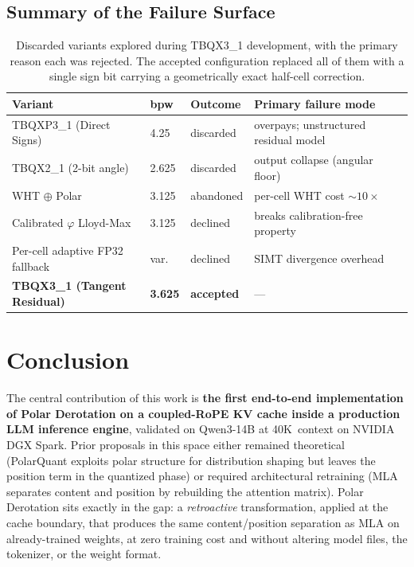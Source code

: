 \documentclass[10pt,twocolumn]{article}
\begin{document}
\subsection{Summary of the Failure Surface}

\begin{table}[t]
\centering
\small
\begin{tabular}{@{}lllll@{}}
\toprule
\textbf{Variant} & \textbf{bpw} & \textbf{Outcome} & \textbf{Primary failure mode} \\
\midrule
TBQXP3\_1 (Direct Signs)            & 4.25 & discarded & overpays; unstructured residual model \\
TBQX2\_1 (2-bit angle)              & 2.625 & discarded & output collapse (angular floor) \\
WHT $\oplus$ Polar                  & 3.125 & abandoned & per-cell WHT cost $\sim 10\times$ \\
Calibrated $\varphi$ Lloyd-Max      & 3.125 & declined  & breaks calibration-free property \\
Per-cell adaptive FP32 fallback     & var.  & declined  & SIMT divergence overhead \\
\midrule
\textbf{TBQX3\_1 (Tangent Residual)} & \textbf{3.625} & \textbf{accepted} & --- \\
\bottomrule
\end{tabular}
\caption{Discarded variants explored during TBQX3\_1 development, with the primary reason each was rejected. The accepted configuration replaced all of them with a single sign bit carrying a geometrically exact half-cell correction.}
\label{tab:deadends}
\end{table}

\section{Conclusion}
\label{sec:conclusion}

The central contribution of this work is \textbf{the first end-to-end implementation of Polar Derotation on a coupled-RoPE KV cache inside a production LLM inference engine}, validated on Qwen3-14B at 40K~context on NVIDIA DGX Spark. Prior proposals in this space either remained theoretical (PolarQuant exploits polar structure for distribution shaping but leaves the position term in the quantized phase) or required architectural retraining (MLA separates content and position by rebuilding the attention matrix). Polar Derotation sits exactly in the gap: a \emph{retroactive} transformation, applied at the cache boundary, that produces the same content/position separation as MLA on already-trained weights, at zero training cost and without altering model files, the tokenizer, or the weight format.
\end{document}
